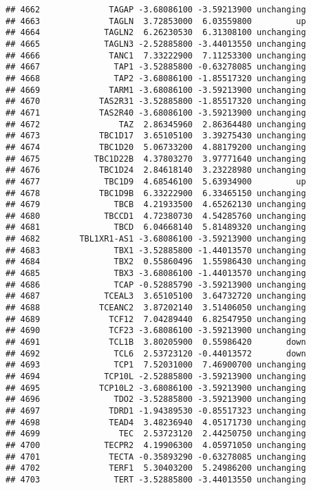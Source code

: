 \documentclass[]{article}
\begin{document}
\begin{verbatim}
## 4662              TAGAP -3.68086100 -3.59213900 unchanging
## 4663              TAGLN  3.72853000  6.03559800         up
## 4664             TAGLN2  6.26230530  6.31308100 unchanging
## 4665             TAGLN3 -2.52885800 -3.44013550 unchanging
## 4666              TANC1  7.33222900  7.11253300 unchanging
## 4667               TAP1 -3.52885800 -0.63278085 unchanging
## 4668               TAP2 -3.68086100 -1.85517320 unchanging
## 4669              TARM1 -3.68086100 -3.59213900 unchanging
## 4670            TAS2R31 -3.52885800 -1.85517320 unchanging
## 4671            TAS2R40 -3.68086100 -3.59213900 unchanging
## 4672                TAZ  2.86345960  2.86364480 unchanging
## 4673            TBC1D17  3.65105100  3.39275430 unchanging
## 4674            TBC1D20  5.06733200  4.88179200 unchanging
## 4675           TBC1D22B  4.37803270  3.97771640 unchanging
## 4676            TBC1D24  2.84618140  3.23228980 unchanging
## 4677             TBC1D9  4.68546100  5.63934900         up
## 4678            TBC1D9B  6.33222900  6.33465150 unchanging
## 4679               TBCB  4.21933500  4.65262130 unchanging
## 4680             TBCCD1  4.72380730  4.54285760 unchanging
## 4681               TBCD  6.04668140  5.81489320 unchanging
## 4682        TBL1XR1-AS1 -3.68086100 -3.59213900 unchanging
## 4683               TBX1 -3.52885800 -1.44013570 unchanging
## 4684               TBX2  0.55860496  1.55986430 unchanging
## 4685               TBX3 -3.68086100 -1.44013570 unchanging
## 4686               TCAP -0.52885790 -3.59213900 unchanging
## 4687             TCEAL3  3.65105100  3.64732720 unchanging
## 4688            TCEANC2  3.87202140  3.51406050 unchanging
## 4689              TCF12  7.04289440  6.82547950 unchanging
## 4690              TCF23 -3.68086100 -3.59213900 unchanging
## 4691              TCL1B  3.80205900  0.55986420       down
## 4692               TCL6  2.53723120 -0.44013572       down
## 4693               TCP1  7.52031000  7.46900700 unchanging
## 4694             TCP10L -2.52885800 -3.59213900 unchanging
## 4695            TCP10L2 -3.68086100 -3.59213900 unchanging
## 4696               TDO2 -3.52885800 -3.59213900 unchanging
## 4697              TDRD1 -1.94389530 -0.85517323 unchanging
## 4698              TEAD4  3.48236940  4.05171730 unchanging
## 4699                TEC  2.53723120  2.44250750 unchanging
## 4700             TECPR2  4.19906300  4.05971050 unchanging
## 4701              TECTA -0.35893290 -0.63278085 unchanging
## 4702              TERF1  5.30403200  5.24986200 unchanging
## 4703               TERT -3.52885800 -3.44013550 unchanging

\end{verbatim}
\end{document}
